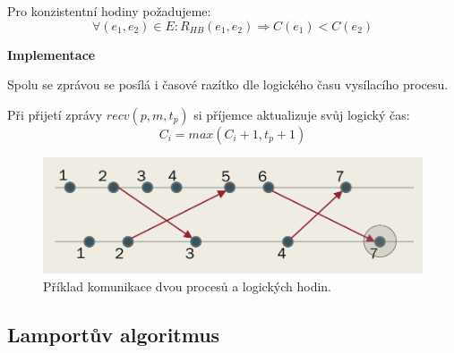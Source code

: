 \begin{compactitem}
\begin{compactitem}
        \item Pro konzistentní hodiny požadujeme:
        $$ \forall (e_1, e_2) \in E : R_{HB}(e_1, e_2) \Rightarrow C(e_1) < C(e_2) $$
    \end{compactitem}

    \item \textbf{Implementace} \begin{compactitem}
        \item Spolu se zprávou se posílá i časové razítko dle logického času vysílacího procesu.

        \item Při přijetí zprávy $recv(p, m, t_p)$ si příjemce aktualizuje svůj logický čas:
        $$ C_i = max(C_{i} + 1, t_{p} + 1) $$
    \end{compactitem}

    \begin{figure}[H]
        \centering
        \includegraphics[width=1\linewidth]{logicke_hoginy.pdf}
        \caption{Příklad komunikace dvou procesů a logických hodin.}
    \end{figure}
\end{compactitem}

\subsection{Lamportův algoritmus}

